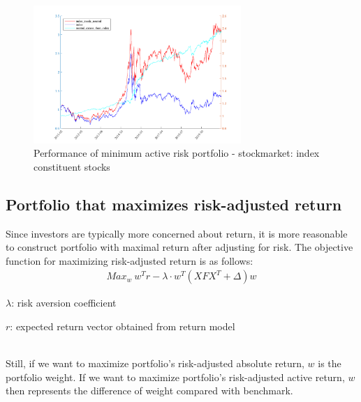 \documentclass[10pt]{article}
\begin{document}
\begin{figure}[H]
    \centering
     \includegraphics[width=0.7\textwidth]{inside_neutral_than_index.png}
    \caption{Performance of minimum active risk portfolio - stockmarket: index constituent stocks}
    \label{fig:Fig4}
\end{figure}

\subsection{Portfolio that maximizes risk-adjusted return}
Since investors are typically more concerned about return, it is more reasonable to construct portfolio with maximal return after adjusting for risk. The objective function for maximizing risk-adjusted return is as follows:
~\\
\begin{equation}
\begin{split}
    Max_w\ w^Tr-\lambda\cdot w^T(XFX^T+\Delta)w 
\end{split}
\end{equation}
\centerline{$\lambda$: risk aversion coefficient}
\centerline{$r$: expected return vector obtained from return model}
~\\
Still, if we want to maximize portfolio's risk-adjusted absolute return, $w$ is the portfolio weight. If we want to maximize portfolio's risk-adjusted active return, $w$ then represents the difference of weight compared with benchmark.
\end{document}
